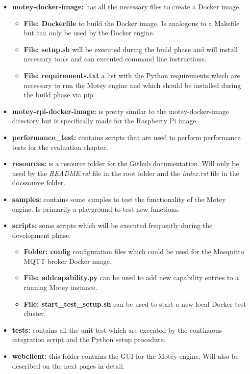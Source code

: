 \begin{itemize}
  \item{\textbf{motey-docker-image:}} has all the necessary files to create a Docker image.
  \begin{itemize}
    \item{\textbf{File: Dockerfile}} to build the Docker image. Is analogous to a Makefile but can only be used by the Docker engine.
    \item{\textbf{File: setup.sh}} will be executed during the build phase and will install necessary tools and can executed command line instructions.
    \item{\textbf{File: requirements.txt}} a list with the Python requirements which are necessary to run the Motey engine and which should be installed during the build phase via pip.
  \end{itemize}
  \item{\textbf{motey-rpi-docker-image:}} is pretty similar to the motey-docker-image directory but is specifically made for the Raspberry Pi image.
  \item{\textbf{performance\_test:}} contains scripts that are used to perform performance tests for the evaluation chapter.
  \item{\textbf{resources:}} is a resource folder for the Github documentation. Will only be used by the \textit{README.rst} file in the root folder and the \textit{index.rst} file in the docs\/source folder.
  \item{\textbf{samples:}} contains some samples to test the functionality of the Motey engine. Is primarily a playground to test new functions.
  \item{\textbf{scripts:}} some scripts which will be executed frequently during the development phase.
  \begin{itemize}
    \item{\textbf{Folder: config}} configuration files which could be used for the Mosquitto \ac{MQTT} broker Docker image.
    \item{\textbf{File: addcapability.py}} can be used to add new capability entries to a running Motey instance.
    \item{\textbf{File: start\_test\_setup.sh}} can be used to start a new local Docker test cluster.
  \end{itemize}
  \item{\textbf{tests:}} contains all the unit test which are executed by the continuous integration script and the Python setup procedure.
  \item{\textbf{webclient:}} this folder contains the \ac{GUI} for the Motey engine. Will also be described on the next pages in detail.
\end{itemize}


